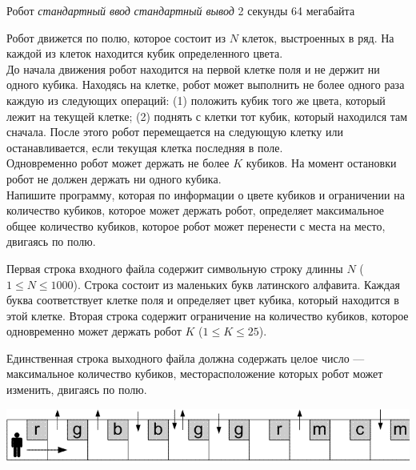 \begin{problem}%
{Робот}%
{\textsl{стандартный ввод}}%
{\textsl{стандартный вывод}}%
{2 секунды}%
{64 мегабайта}{}

Робот движется по полю, которое состоит из $N$ клеток, выстроенных в ряд. На каждой из клеток находится кубик определенного цвета.\\

До начала движения робот находится на первой клетке поля и не держит ни одного кубика. Находясь на клетке, робот может выполнить не более одного раза каждую из следующих операций: (1) положить кубик того же цвета, который лежит на текущей клетке; (2) поднять с клетки тот кубик, который находился там сначала. После этого робот перемещается на следующую клетку или останавливается, если текущая клетка последняя в поле.\\

Одновременно робот может держать не более $K$ кубиков. На момент остановки робот не должен держать ни одного кубика.\\

Напишите программу, которая по информации о цвете кубиков и ограничении на количество кубиков, которое может держать робот, определяет максимальное общее количество кубиков, которое робот может перенести с места на место, двигаясь по полю.

\InputFile

Первая строка входного файла содержит символьную строку длинны $N$ ($1 \le N \le 1000$). Строка состоит из маленьких букв латинского алфавита. Каждая буква соответствует клетке поля и определяет цвет кубика, который находится в этой клетке. Вторая строка содержит ограничение на количество кубиков, которое одновременно может держать робот $K$ ($1 \le K \le 25$).

\OutputFile

Единственная строка выходного файла должна содержать целое число — максимальное количество кубиков, месторасположение которых робот может изменить, двигаясь по полю.

\Examples

\begin{example}
%
\end{example}

\Explanation

\includegraphics[scale=0.5]{images/1359.png}

\end{problem}